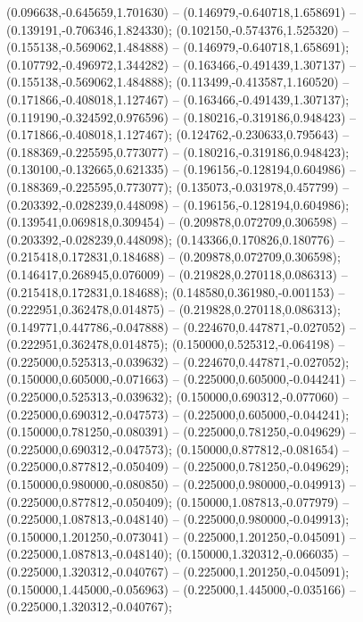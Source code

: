  (0.096638,-0.645659,1.701630) -- (0.146979,-0.640718,1.658691) -- (0.139191,-0.706346,1.824330);
 (0.102150,-0.574376,1.525320) -- (0.155138,-0.569062,1.484888) -- (0.146979,-0.640718,1.658691);
 (0.107792,-0.496972,1.344282) -- (0.163466,-0.491439,1.307137) -- (0.155138,-0.569062,1.484888);
 (0.113499,-0.413587,1.160520) -- (0.171866,-0.408018,1.127467) -- (0.163466,-0.491439,1.307137);
 (0.119190,-0.324592,0.976596) -- (0.180216,-0.319186,0.948423) -- (0.171866,-0.408018,1.127467);
 (0.124762,-0.230633,0.795643) -- (0.188369,-0.225595,0.773077) -- (0.180216,-0.319186,0.948423);
 (0.130100,-0.132665,0.621335) -- (0.196156,-0.128194,0.604986) -- (0.188369,-0.225595,0.773077);
 (0.135073,-0.031978,0.457799) -- (0.203392,-0.028239,0.448098) -- (0.196156,-0.128194,0.604986);
 (0.139541,0.069818,0.309454) -- (0.209878,0.072709,0.306598) -- (0.203392,-0.028239,0.448098);
 (0.143366,0.170826,0.180776) -- (0.215418,0.172831,0.184688) -- (0.209878,0.072709,0.306598);
 (0.146417,0.268945,0.076009) -- (0.219828,0.270118,0.086313) -- (0.215418,0.172831,0.184688);
 (0.148580,0.361980,-0.001153) -- (0.222951,0.362478,0.014875) -- (0.219828,0.270118,0.086313);
 (0.149771,0.447786,-0.047888) -- (0.224670,0.447871,-0.027052) -- (0.222951,0.362478,0.014875);
 (0.150000,0.525312,-0.064198) -- (0.225000,0.525313,-0.039632) -- (0.224670,0.447871,-0.027052);
 (0.150000,0.605000,-0.071663) -- (0.225000,0.605000,-0.044241) -- (0.225000,0.525313,-0.039632);
 (0.150000,0.690312,-0.077060) -- (0.225000,0.690312,-0.047573) -- (0.225000,0.605000,-0.044241);
 (0.150000,0.781250,-0.080391) -- (0.225000,0.781250,-0.049629) -- (0.225000,0.690312,-0.047573);
 (0.150000,0.877812,-0.081654) -- (0.225000,0.877812,-0.050409) -- (0.225000,0.781250,-0.049629);
 (0.150000,0.980000,-0.080850) -- (0.225000,0.980000,-0.049913) -- (0.225000,0.877812,-0.050409);
 (0.150000,1.087813,-0.077979) -- (0.225000,1.087813,-0.048140) -- (0.225000,0.980000,-0.049913);
 (0.150000,1.201250,-0.073041) -- (0.225000,1.201250,-0.045091) -- (0.225000,1.087813,-0.048140);
 (0.150000,1.320312,-0.066035) -- (0.225000,1.320312,-0.040767) -- (0.225000,1.201250,-0.045091);
 (0.150000,1.445000,-0.056963) -- (0.225000,1.445000,-0.035166) -- (0.225000,1.320312,-0.040767);
